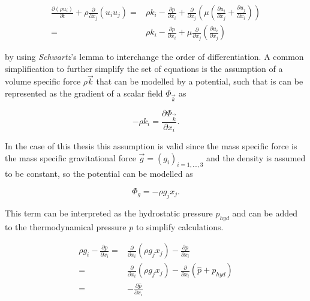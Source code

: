       \begin{align}
        \frac{\partial \left(\rho u_i \right)}{\partial t} 
        + \rho \frac{\partial}{\partial x_j} \left( u_i  u_j \right) 
        =& \rho k_i
        - \frac{\partial p}{\partial x_i}
      + \frac{\partial}{\partial x_j} \left( \mu  \left( \frac{\partial u_i}{\partial x_j} 
                                              + \frac{\partial u_j}{\partial x_i} \right) \right) \\
        =& \rho k_i
        - \frac{\partial p}{\partial x_i}
        + \mu \frac{\partial}{\partial x_j} \left( \frac{\partial u_i}{\partial x_j} \right)
      \end{align}

      by using \textit{Schwartz}'s lemma to interchange the order of differentiation. A common simplification to further simplify the set of equations is the assumption of a volume specific force \(\rho \vec{k}\) that can be modelled by a potential, such that is can be represented as the gradient of a scalar field \(\Phi_\vec{k}\) as

      \begin{displaymath}
       - \rho k_i = \frac{\partial \Phi_\vec{k}}{\partial x_i}.
      \end{displaymath}

      In the case of this thesis this assumption is valid since the mass specific force is the mass specific gravitational force \(\vec{g} = \left( g_i \right)_{i = 1,\dots,3}\) and the density is assumed to be constant, so the potential can be modelled as

      \begin{displaymath}
        \Phi_g = - \rho g_j x_j.
      \end{displaymath}

      This term can be interpreted as the hydrostatic pressure \(p_{hyd}\) and can be added to the thermodynamical pressure \(p\) to simplify calculations. 

      \begin{align}
        \rho g_i - \frac{\partial p}{\partial x_i} 
        =& \frac{\partial}{\partial x_i} \left( \rho g_j x_j \right) - \frac{\partial p}{\partial x_i} \nonumber \\
        =& \frac{\partial}{\partial x_i} \left( \rho g_j x_j \right) - \frac{\partial}{\partial x_i}  \left(\hat{p} + p_{hyd} \right) \nonumber \\
        =& - \frac{\partial \hat{p}}{\partial x_i}
      \end{align}

